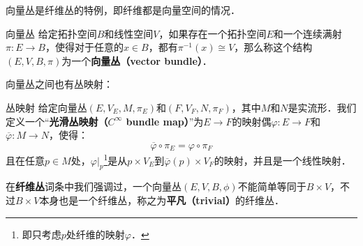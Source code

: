 
向量丛是纤维丛的特例，即纤维都是向量空间的情况．

\begin{definition}{向量丛}
给定拓扑空间$B$和线性空间$V$，如果存在一个拓扑空间$E$和一个连续满射$\pi:E\rightarrow B$，使得对于任意的$x\in B$，都有$\pi^{-1}(x)\cong V$，那么称这个结构$(E, V, B, \pi)$为一个\textbf{向量丛（vector bundle）}．
\end{definition}

向量丛之间也有丛映射：

\begin{definition}{丛映射}
给定向量丛$(E, V_E, M, \pi_E)$和$(F, V_F, N, \pi_F)$，其中$M$和$N$是实流形．我们定义一个“\textbf{光滑丛映射（$C^\infty$ bundle map）}”为$E\rightarrow F$的映射偶$\varphi: E\rightarrow F$和$\overline{\varphi}: M\rightarrow N$，使得：
\begin{equation}
\overline{\varphi}\circ\pi_E=\varphi\circ\pi_F
\end{equation}
且在任意$p\in M$处，$\varphi|_p$\footnote{即只考虑$p$处纤维的映射$\varphi$．}是从$p\times V_E$到$\overline{\varphi}(p)\times V_F$的映射，并且是一个线性映射．
\end{definition}

在\textbf{纤维丛}词条中我们强调过，一个向量丛$(E, V, B, \phi)$不能简单等同于$B\times V$，不过$B\times V$本身也是一个纤维丛，称之为\textbf{平凡（trivial）}的纤维丛．




